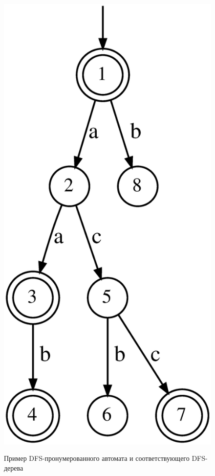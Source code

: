 \begin{figure}[ht]
{    \includegraphics[scale=0.15]{img/datamod/DFS-tree.eps}
  }
  \caption{Пример DFS-пронумерованного автомата и соответствующего DFS-дерева}
  \label{syn:img:dfs}
\end{figure}

